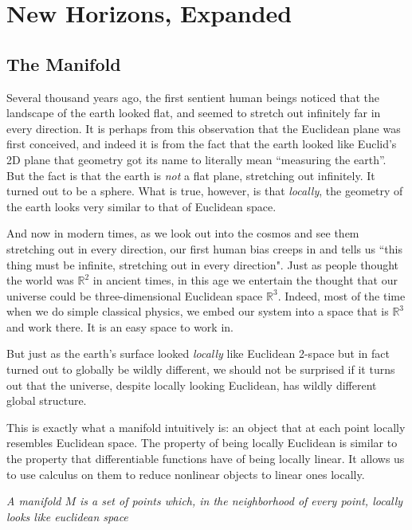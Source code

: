 \documentclass[../master.tex]{subfiles}
\begin{document}
	
\chapter{New Horizons, Expanded}\thispagestyle{empty}
	
	\section{The Manifold} %
	\label{sec:the_manifold}
	Several thousand years ago, the first sentient human beings noticed that the landscape of the earth looked flat, and seemed to stretch out infinitely far in every direction. It is perhaps from this observation that the Euclidean plane was first conceived, and indeed it is from the fact that the earth looked like Euclid's 2D plane that geometry got its name to literally mean ``measuring the earth''. But the fact is that the earth is \emph{not} a flat plane, stretching out infinitely. It turned out to be a sphere. What is true, however, is that \emph{locally}, the geometry of the earth looks very similar to that of Euclidean space. 
	
	And now in modern times, as we look out into the cosmos and see them stretching out in every direction, our first human bias creeps in and tells us ``this thing must be infinite, stretching out in every direction". Just as people thought the world was $\mathbb R^2$ in ancient times, in this age we entertain the thought that our universe could be three-dimensional Euclidean space $\mathbb R^3$. Indeed, most of the time when we do simple classical physics, we embed our system into a space that is $\mathbb R^3$ and work there. It is an easy space to work in. 
	
	But just as the earth's surface looked \emph{locally} like Euclidean 2-space but in fact turned out to globally be wildly different, we should not be surprised if it turns out that the universe, despite locally looking Euclidean, has wildly different global structure. 
	
	This is exactly what a manifold intuitively is: an object that at each point locally resembles Euclidean space. The property of being locally Euclidean is similar to the property that differentiable functions have of being locally linear. It allows us to use calculus on them to reduce nonlinear objects to linear ones locally. 
	
	\begin{concept}
	\textit{A manifold $M$ is a set of points which, in the neighborhood of every point, locally looks like euclidean space}
	\end{concept}
	
\end{document}
